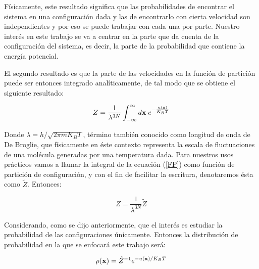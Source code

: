 \documentclass [11pt]{article}
\begin{document}
 Físicamente, este resultado significa que las probabilidades de encontrar el sistema en una configuración dada y las de encontrarlo con cierta velocidad son independientes y por eso se puede trabajar con cada una por parte. Nuestro interés en este trabajo se va a centrar en la parte que da cuenta de la configuración del sistema, es decir, la parte de la probabilidad que contiene la energía potencial. 
 
 El segundo resultado es que la parte de las velocidades en la función de partición puede ser entonces integrado analíticamente, de tal modo que se obtiene el siguiente resultado:



\begin{equation}\label{FP}
    Z=\frac{1}{\lambda^{3N}}\int_{-\infty}^{\infty}d{\bf x}{\hspace{0.1 cm}}e^{-\frac{u({\bf x})}{K_BT}}
\end{equation}

Donde $\lambda=h/\sqrt{2\pi m K_B T}$, término también conocido como longitud de onda de De Broglie, que físicamente en éste contexto representa la escala de fluctuaciones de una molécula generadas por una temperatura dada. Para nuestros usos prácticos vamos a llamar la integral de la ecuación (\ref{FP}) como función de partición de configuración, y con el fin de facilitar la escritura, denotaremos ésta como $\tilde Z$. Entonces:

\begin{equation}
    Z=\frac{1}{\lambda^{3N}}\tilde{Z}
\end{equation}

Considerando, como se dijo anteriormente, que el interés es estudiar la probabilidad de las configuraciones únicamente. Entonces la distribución de probabilidad en la que se enfocará este trabajo será:

\begin{equation}\label{densidad_proba}
    \rho({\bf x})=\tilde{Z}^{-1}e^{-u({\bf x})/K_BT}
\end{equation}\\
\end{document}
